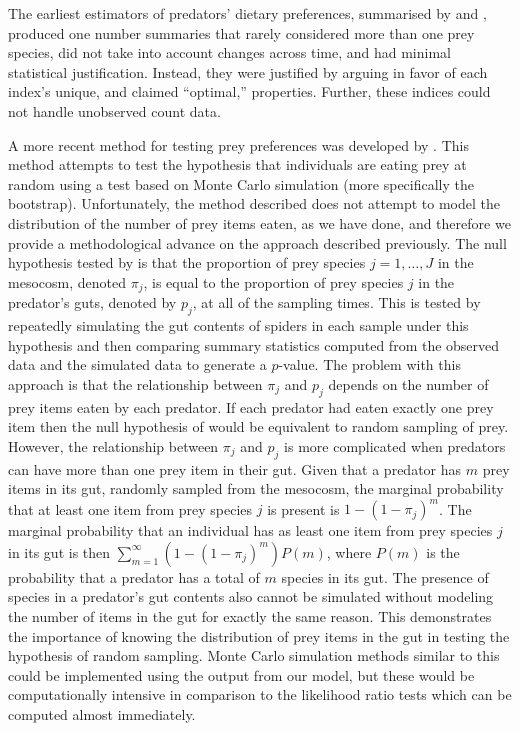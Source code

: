\documentclass[smallextended]{svjour3}
\begin{document}
The earliest estimators of predators' dietary preferences, summarised by \citet{Lechowicz:1982} and \citet{Manly:2002}, produced one number summaries that rarely considered more than one prey species, did not take into account changes across time, and had minimal statistical justification.  Instead, they were justified by arguing in favor of each index's unique, and claimed ``optimal,'' properties.  Further, these indices could not handle unobserved count data.

A more recent method for testing prey preferences was developed by \citet{Agusti:2003}.  This method attempts to test the hypothesis that individuals are eating prey at random using a test based on Monte Carlo simulation (more specifically the bootstrap).  Unfortunately, the method described does not attempt to model the distribution of the number of prey items eaten, as we have done, and therefore we provide a methodological advance on the approach described previously.  The null hypothesis tested by \citet{Agusti:2003} is that the proportion of prey species $j=1,\ldots,J$ in the mesocosm, denoted $\pi_j$, is equal to the proportion of prey species $j$ in the predator's guts, denoted by $p_j$, at all of the sampling times.  This is tested by repeatedly simulating the gut contents of spiders in each sample under this hypothesis and then comparing summary statistics computed from the observed data and the simulated data to generate a $p$-value.  The problem with this approach is that the relationship between $\pi_j$ and $p_j$ depends on the number of prey items eaten by each predator.  If each predator had eaten exactly one prey item then the null hypothesis of \citet{Agusti:2003} would be equivalent to random sampling of prey.  However, the relationship between $\pi_j$ and $p_j$ is more complicated when predators can have more than one prey item in their gut.  Given that a predator has $m$ prey items in its gut, randomly sampled from the mesocosm, the marginal probability that at least one item from prey species $j$ is present is $1-(1-\pi_j)^m$.  The marginal probability that an individual has as least one item from prey species $j$ in its gut is then $\sum_{m=1}^{\infty} (1-(1-\pi_j)^m)P(m)$, where $P(m)$ is the probability that a predator has a total of $m$ species in its gut.  The presence of species in a predator's gut contents also cannot be simulated without modeling the number of items in the gut for exactly the same reason.  This demonstrates the importance of knowing the distribution of prey items in the gut in testing the hypothesis of random sampling.  Monte Carlo simulation methods similar to this could be implemented using the output from our model, but these would be computationally intensive in comparison to the likelihood ratio tests which can be computed almost immediately.
\end{document}
